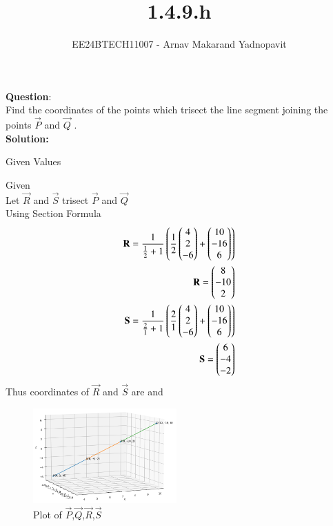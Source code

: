 \documentclass[journal]{IEEEtran}
\begin{document}

\title{1.4.9.h}
\author{EE24BTECH11007 - Arnav Makarand Yadnopavit}
{\let\newpage\relax\maketitle}
\renewcommand{\thefigure}{\theenumi}
\renewcommand{\thetable}{\theenumi}
\setlength{\intextsep}{10pt} %
\renewcommand{\thetable}{\theenumi}
\textbf{Question}:\\
Find the coordinates of the points which trisect the line segment joining the points
$\vec{P}$  and $\vec{Q}$ .\\
\textbf{Solution:}
\begin{table}[h]
    \centering
    
    \caption{Given Values}
    \label{tab:1}
\end{table}
Given\\
Let $\vec{R}$ and $\vec{S}$ trisect $\vec{P}$ and $\vec{Q}$\\
Using Section Formula
\begin{align}
\mathbf{R}=\frac{1}{\frac{1}{2}+1}\left(\frac{1}{2}\begin{pmatrix}4\\2\\-6\end{pmatrix}+\begin{pmatrix}10\\-16\\6\end{pmatrix}\right)\\
\mathbf{R}=\begin{pmatrix}8\\-10\\2\end{pmatrix}\\
\mathbf{S}=\frac{1}{\frac{2}{1}+1}\left(\frac{2}{1}\begin{pmatrix}4\\2\\-6\end{pmatrix}+\begin{pmatrix}10\\-16\\6\end{pmatrix}\right)\\
\mathbf{S}=\begin{pmatrix}6\\-4\\-2\end{pmatrix}
\end{align}
Thus coordinates of $\vec{R}$ and $\vec{S}$ are  and  
\begin{figure}[h]
    \centering
    \includegraphics[width=5.5cm]{figs/fig.png}
    \caption{Plot of $\vec{P}$,$\vec{Q}$,$\vec{R}$,$\vec{S}$}
 \end{figure}
\end{document}
